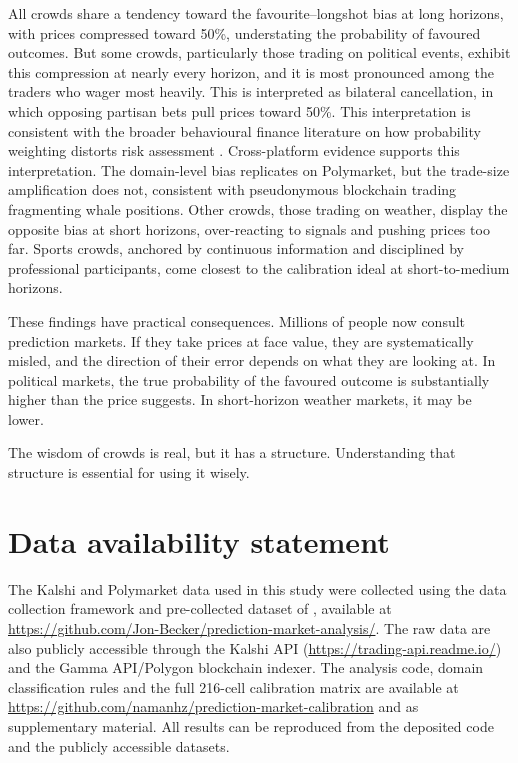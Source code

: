 \documentclass[numsec,webpdf,modern,medium]{oup-authoring-template}
\theoremstyle{thmstyleone}%
\theoremstyle{thmstyletwo}%
\theoremstyle{thmstylethree}%
\begin{document}
All crowds share a tendency toward the favourite--longshot bias at long horizons, with prices compressed toward 50\%, understating the probability of favoured outcomes. But some crowds, particularly those trading on political events, exhibit this compression at nearly every horizon, and it is most pronounced among the traders who wager most heavily. This is interpreted as bilateral cancellation, in which opposing partisan bets pull prices toward 50\%. This interpretation is consistent with the broader behavioural finance literature on how probability weighting distorts risk assessment \citep{kahneman1979prospect,tversky1992advances}. Cross-platform evidence supports this interpretation. The domain-level bias replicates on Polymarket, but the trade-size amplification does not, consistent with pseudonymous blockchain trading fragmenting whale positions. Other crowds, those trading on weather, display the opposite bias at short horizons, over-reacting to signals and pushing prices too far. Sports crowds, anchored by continuous information and disciplined by professional participants, come closest to the calibration ideal at short-to-medium horizons.

These findings have practical consequences. Millions of people now consult prediction markets. If they take prices at face value, they are systematically misled, and the direction of their error depends on what they are looking at. In political markets, the true probability of the favoured outcome is substantially higher than the price suggests. In short-horizon weather markets, it may be lower.

The wisdom of crowds is real, but it has a structure. Understanding that structure is essential for using it wisely.
\section*{Data availability statement}

The Kalshi and Polymarket data used in this study were collected using the data collection framework and pre-collected dataset of \citet{becker2026microstructure}, available at \url{https://github.com/Jon-Becker/prediction-market-analysis/}. The raw data are also publicly accessible through the Kalshi API (\url{https://trading-api.readme.io/}) and the Gamma API/Polygon blockchain indexer. The analysis code, domain classification rules and the full 216-cell calibration matrix are available at \url{https://github.com/namanhz/prediction-market-calibration} and as supplementary material. All results can be reproduced from the deposited code and the publicly accessible datasets.
\end{document}
